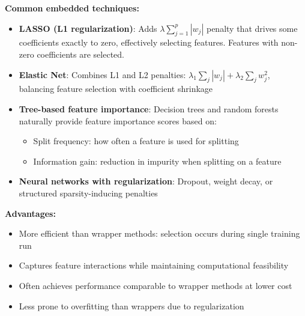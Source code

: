 \textbf{Common embedded techniques:}
\begin{itemize}
\item \textbf{LASSO (L1 regularization)}: Adds $\lambda\sum_{j=1}^p|w_j|$ penalty that drives some coefficients exactly to zero, effectively selecting features.
Features with non-zero coefficients are selected.

\item \textbf{Elastic Net}: Combines L1 and L2 penalties: $\lambda_1\sum_j|w_j| + \lambda_2\sum_jw_j^2$, balancing feature selection with coefficient shrinkage

\item \textbf{Tree-based feature importance}: Decision trees and random forests naturally provide feature importance scores based on:
\begin{itemize}
\item Split frequency: how often a feature is used for splitting
\item Information gain: reduction in impurity when splitting on a feature
\end{itemize}

\item \textbf{Neural networks with regularization}: Dropout, weight decay, or structured sparsity-inducing penalties

\end{itemize}

\textbf{Advantages:}
\begin{itemize}
\item More efficient than wrapper methods: selection occurs during single training run
\item Captures feature interactions while maintaining computational feasibility
\item Often achieves performance comparable to wrapper methods at lower cost
\item Less prone to overfitting than wrappers due to regularization
\end{itemize}

